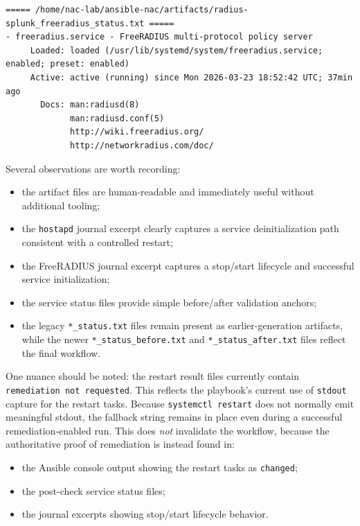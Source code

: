 \documentclass[11pt]{article}
\begin{document}
\begin{verbatim}
===== /home/nac-lab/ansible-nac/artifacts/radius-splunk_freeradius_status.txt =====
- freeradius.service - FreeRADIUS multi-protocol policy server
     Loaded: loaded (/usr/lib/systemd/system/freeradius.service; enabled; preset: enabled)
     Active: active (running) since Mon 2026-03-23 18:52:42 UTC; 37min ago
       Docs: man:radiusd(8)
             man:radiusd.conf(5)
             http://wiki.freeradius.org/
             http://networkradius.com/doc/
\end{verbatim}

Several observations are worth recording:

\begin{itemize}
    \item the artifact files are human-readable and immediately useful without additional tooling;
    \item the \texttt{hostapd} journal excerpt clearly captures a service deinitialization path consistent with a controlled restart;
    \item the FreeRADIUS journal excerpt captures a stop/start lifecycle and successful service initialization;
    \item the service status files provide simple before/after validation anchors;
    \item the legacy \texttt{*\_status.txt} files remain present as earlier-generation artifacts, while the newer \texttt{*\_status\_before.txt} and \texttt{*\_status\_after.txt} files reflect the final workflow.
\end{itemize}

One nuance should be noted: the restart result files currently contain \texttt{remediation not requested}. This reflects the playbook's current use of \texttt{stdout} capture for the restart tasks. Because \texttt{systemctl restart} does not normally emit meaningful stdout, the fallback string remains in place even during a successful remediation-enabled run. This does \emph{not} invalidate the workflow, because the authoritative proof of remediation is instead found in:

\begin{itemize}
    \item the Ansible console output showing the restart tasks as \texttt{changed};
    \item the post-check service status files;
    \item the journal excerpts showing stop/start lifecycle behavior.
\end{itemize}
\end{document}
